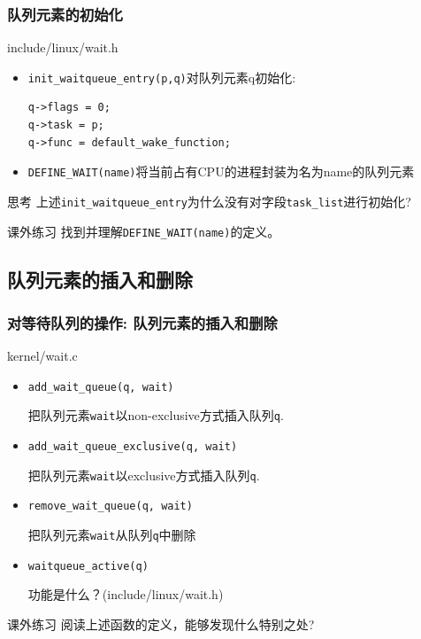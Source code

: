 \documentclass[xcolor=svgnames]{beamer}
\begin{document}
\begin{CJK*}{UTF8}{gbsn}
\begin{frame}[fragile]
\frametitle{队列元素的初始化}
\begin{block}{include/linux/wait.h}
\begin{itemize}
\item \verb|init_waitqueue_entry(p,q)|对队列元素q初始化:
\begin{verbatim}
q->flags = 0;
q->task = p;
q->func = default_wake_function;
\end{verbatim}
\item \verb|DEFINE_WAIT(name)|将当前占有CPU的进程封装为名为name的队列元素
\end{itemize}
\end{block}
\begin{block}{思考}
上述\verb|init_waitqueue_entry|为什么没有对字段\verb|task_list|进行初始化?
\end{block}
\begin{block}{课外练习}
找到并理解\verb|DEFINE_WAIT(name)|的定义。
\end{block}
\end{frame}

\subsection{队列元素的插入和删除}

\begin{frame}[fragile]
\frametitle{对等待队列的操作: 队列元素的插入和删除}
\begin{block}{kernel/wait.c}
\begin{itemize}
\item \verb|add_wait_queue(q, wait)|

把队列元素\verb|wait|以non-exclusive方式插入队列\verb|q|.
\item \verb|add_wait_queue_exclusive(q, wait)|

把队列元素\verb|wait|以exclusive方式插入队列\verb|q|.
\item \verb|remove_wait_queue(q, wait)|

把队列元素\verb|wait|从队列\verb|q|中删除
\item \verb|waitqueue_active(q)| 

功能是什么？(include/linux/wait.h)
\end{itemize}
\end{block}
\begin{block}{课外练习}
阅读上述函数的定义，能够发现什么特别之处?
\end{block}
\end{frame}


\end{CJK*}
\end{document}
